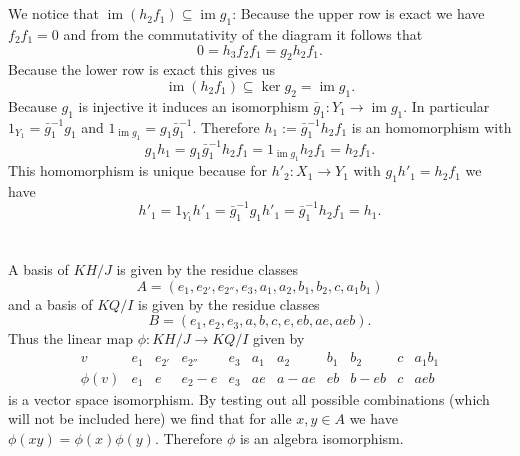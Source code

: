 \documentclass[a4paper,10pt]{article}
\theoremstyle{definition}
\newcommand{\img}{\operatorname{im}}
\begin{document}
\section{}
We notice that $\img(h_2 f_1) \subseteq \img g_1$: Because the upper row is exact we have $f_2 f_1 = 0$ and from the commutativity of the diagram it follows that
\[
 0 = h_3 f_2 f_1 =  g_2 h_2 f_1.
\]
Because the lower row is exact this gives us
\[
 \img(h_2 f_1) \subseteq \ker g_2 = \img g_1.
\]
Because $g_1$ is injective it induces an isomorphism $\bar{g}_1 : Y_1 \rightarrow \img g_1$. In particular $1_{Y_1} = \bar{g}_1^{-1} g_1$ and $1_{\img g_1} = g_1 \bar{g}_1^{-1}$. Therefore $h_1 := \bar{g}_1^{-1} h_2 f_1$ is an homomorphism with
\[
 g_1 h_1 = g_1 \bar{g}_1^{-1} h_2 f_1 = 1_{\img g_1} h_2 f_1 = h_2 f_1.
\]
This homomorphism is unique because for $h'_2 : X_1 \rightarrow Y_1$ with $g_1 h'_1 = h_2 f_1$ we have
\[
 h'_1 = 1_{Y_1} h'_1 = \bar{g}_1^{-1} g_1 h'_1 = \bar{g}^{-1}_1 h_2 f_1 = h_1.
\]





\addtocounter{section}{1}





\section{}
A basis of $KH/J$ is given by the residue classes 
\[
 A = (e_1, e_{2'}, e_{2''}, e_3, a_1, a_2, b_1, b_2, c, a_1b_1)
\]
and a basis of $KQ/I$ is given by the residue classes
\[
 B = (e_1, e_2, e_3, a, b, c, e, eb, ae, aeb).
\]
Thus the linear map $\phi : KH/J \rightarrow KQ/I$ given by
\[
 \begin{array}{c|cccccccccc}
  v       & e_1 & e_{2'} & e_{2''} & e_3 & a_1 &  a_2 & b_1 &  b_2 & c & a_1 b_1 \\ \hline
  \phi(v) & e_1 &      e &   e_2-e & e_3 &  ae & a-ae &  eb & b-eb & c & aeb
 \end{array}
\]
is a vector space isomorphism. By testing out all possible combinations (which will not be included here) we find that for alle $x,y \in A$ we have $\phi(xy) = \phi(x)\phi(y)$. Therefore $\phi$ is an algebra isomorphism.
\end{document}
